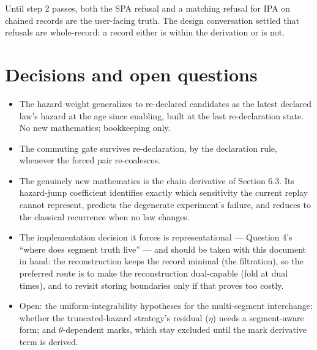 \documentclass[11pt]{article}
\begin{document}
Until step 2 passes, both the SPA refusal and a matching refusal for
IPA on chained records are the user-facing truth. The design
conversation settled that refusals are whole-record: a record either is
within the derivation or is not.

\section{Decisions and open questions}

\begin{itemize}
\item The hazard weight generalizes to re-declared candidates as the
  latest declared law's hazard at the age since enabling, built at the
  last re-declaration state. No new mathematics; bookkeeping only.
\item The commuting gate survives re-declaration, by the declaration
  rule, whenever the forced pair re-coalesces.
\item The genuinely new mathematics is the chain derivative of Section
  6.3. Its hazard-jump coefficient identifies exactly which sensitivity
  the current replay cannot represent, predicts the degenerate
  experiment's failure, and reduces to the classical recurrence when no
  law changes.
\item The implementation decision it forces is representational ---
  Question 4's ``where does segment truth live'' --- and should be taken
  with this document in hand: the reconstruction keeps the record
  minimal (the filtration), so the preferred route is to make the
  reconstruction dual-capable (fold at dual times), and to revisit
  storing boundaries only if that proves too costly.
\item Open: the uniform-integrability hypotheses for the multi-segment
  interchange; whether the truncated-hazard strategy's residual
  ($\eta$) needs a segment-aware form; and $\theta$-dependent marks,
  which stay excluded until the mark derivative term is derived.
\end{itemize}
\end{document}
